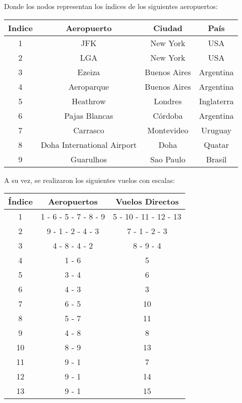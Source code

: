 Donde los nodos representan los índices de los siguientes aeropuertos:
\begin{center}
	\begin{tabular}{ c | c | c | c}
	  \textbf{Indice} & \textbf{Aeropuerto} & \textbf{Ciudad} & \textbf{País}\\ \hline
	  1 & JFK & New York & USA \\
	  2 & LGA & New York & USA \\
	  3 & Ezeiza & Buenos Aires & Argentina\\
	  4 & Aeroparque & Buenos Aires & Argentina\\
	  5 & Heathrow & Londres & Inglaterra \\
	  6 & Pajas Blancas & Córdoba & Argentina \\
	  7 & Carrasco & Montevideo & Uruguay \\
	  8 & Doha International Airport & Doha & Quatar \\
	  9 & Guarulhos & Sao Paulo & Brasil \\
	  
	\end{tabular}	
\end{center}

A su vez, se realizaron los siguientes vuelos con escalas:
\begin{center}
	\begin{tabular}{ c | c | c }
	\textbf{Índice} & \textbf{Aeropuertos} & \textbf{Vuelos Directos} \\ \hline
	1 & 1 - 6 - 5 - 7 - 8 - 9 & 5 - 10 - 11 - 12 - 13 \\
	2 & 9 - 1 - 2 - 4 - 3 & 7 - 1 - 2 - 3 \\
	3 & 4 - 8 - 4 - 2 & 8 - 9 - 4 \\
	4 & 1 - 6 & 5 \\
	5 & 3 - 4 & 6 \\
	6 & 4 - 3 & 3 \\
	7 & 6 - 5 & 10 \\
	8 & 5 - 7 & 11 \\
	9 & 4 - 8 & 8 \\
	10 & 8 - 9 & 13 \\
	11 & 9 - 1 & 7 \\
	12 & 9 - 1 & 14 \\
	13 & 9 - 1 & 15 \\
	\end{tabular}
\end{center}


